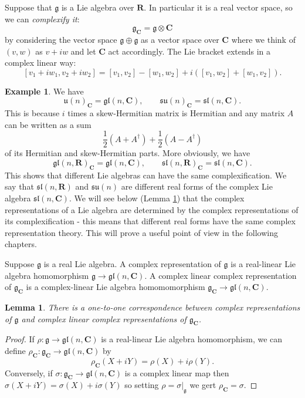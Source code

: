 \documentclass[12pt]{article}
\newcommand{\CC}{\mathbf{C}}
\newcommand{\RR}{\mathbf{R}}
\newtheorem{lma}[thm]{Lemma}
\theoremstyle{definition}
\newtheorem{exm}[thm]{Example}
\theoremstyle{check}
\theoremstyle{remark}
\theoremstyle{TheoremNum}
\begin{document}
Suppose that $\mathfrak{g}$ is a Lie algebra over $\RR$. In particular it is a real vector space, so we can {\em complexify it}:
\[\mathfrak{g}_{\CC}=\mathfrak{g}\otimes\CC\]
by considering the vector space $\mathfrak{g}\oplus\mathfrak{g}$ as a vector space over $\CC$ where we think of $(v,w)$ as $v+iw$ and let $\CC$ act accordingly. The Lie bracket extends in a complex linear way:
\[[v_1+iw_1,v_2+iw_2]=[v_1,v_2]-[w_1,w_2]+i([v_1,w_2]+[w_1,v_2]).\]
\begin{exm}
We have
\[\mathfrak{u}(n)_{\CC}=\mathfrak{gl}(n,\CC),\qquad\mathfrak{su}(n)_{\CC}=\mathfrak{sl}(n,\CC).\]
This is because $i$ times a skew-Hermitian matrix is Hermitian and any matrix $A$ can be written as a sum
\[\frac{1}{2}\left(A+A^{\dagger}\right)+\frac{1}{2}\left(A-A^{\dagger}\right)\]
of its Hermitian and skew-Hermitian parts. More obviously, we have
\[\mathfrak{gl}(n,\RR)_{\CC}=\mathfrak{gl}(n,\CC),\qquad\mathfrak{sl}(n,\RR)_{\CC}=\mathfrak{sl}(n,\CC).\]
This shows that different Lie algebras can have the same complexification. We say that $\mathfrak{sl}(n,\RR)$ and $\mathfrak{su}(n)$ are different real forms of the complex Lie algebra $\mathfrak{sl}(n,\CC)$. We will see below (Lemma \ref{lma-complexification}) that the complex representations of a Lie algebra are determined by the complex representations of its complexification - this means that different real forms have the same complex representation theory. This will prove a useful point of view in the following chapters.
\end{exm}

Suppose $\mathfrak{g}$ is a real Lie algebra. A complex representation of $\mathfrak{g}$ is a real-linear Lie algebra homomorphism $\mathfrak{g}\to\mathfrak{gl}(n,\CC)$. A complex linear complex representation of $\mathfrak{g}_{\CC}$ is a complex-linear Lie algebra homomomorphism $\mathfrak{g}_{\CC}\to\mathfrak{gl}(n,\CC)$.

\begin{lma}\label{lma-complexification}
  There is a one-to-one correspondence between complex representations of $\mathfrak{g}$ and complex linear complex representations of $\mathfrak{g}_{\CC}$.
\end{lma}
\begin{proof}
  If $\rho\colon\mathfrak{g}\to\mathfrak{gl}(n,\CC)$ is a real-linear Lie algebra homomorphism, we can define $\rho_{\CC}\colon\mathfrak{g}_{\CC}\to\mathfrak{gl}(n,\CC)$ by
  \[\rho_{\CC}(X+iY)=\rho(X)+i\rho(Y).\]
  Conversely, if $\sigma\colon\mathfrak{g}_{\CC}\to\mathfrak{gl}(n,\CC)$ is a complex linear map then $\sigma(X+iY)=\sigma(X)+i\sigma(Y)$ so setting $\rho=\sigma|_{\mathfrak{g}}$ we gert $\rho_{\CC}=\sigma$.
\end{proof}
\end{document}
